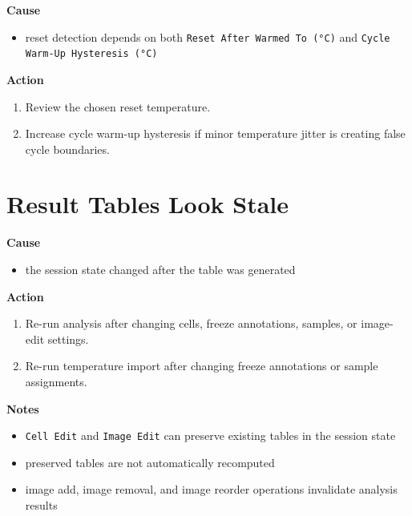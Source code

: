 \documentclass[
  9pt,
  letterpaper,
  oneside,
  open=any,
  DIV=15,
  parskip=half-,
  headings=big,
  numbers=noenddot
]{scrbook}
\newcommand{\manuallead}[1]{%
  \vspace{0.15em}%
  {\sffamily\bfseries\color{ManualBlue}#1}\par\nobreak\vspace{0.05em}%
}
\begin{document}
\manuallead{Cause}

\begin{itemize}[leftmargin=*,itemsep=0.35em,topsep=0.4em]
\item reset detection depends on both \texttt{Reset After Warmed To (°C)} and \texttt{Cycle Warm-Up Hysteresis (°C)}
\end{itemize}

\manuallead{Action}

\begin{enumerate}[leftmargin=*,itemsep=0.35em,topsep=0.4em]
\item Review the chosen reset temperature.
\item Increase cycle warm-up hysteresis if minor temperature jitter is creating false cycle boundaries.
\end{enumerate}

\section{Result Tables Look Stale}

\manuallead{Cause}

\begin{itemize}[leftmargin=*,itemsep=0.35em,topsep=0.4em]
\item the session state changed after the table was generated
\end{itemize}

\manuallead{Action}

\begin{enumerate}[leftmargin=*,itemsep=0.35em,topsep=0.4em]
\item Re-run analysis after changing cells, freeze annotations, samples, or image-edit settings.
\item Re-run temperature import after changing freeze annotations or sample assignments.
\end{enumerate}

\manuallead{Notes}

\begin{itemize}[leftmargin=*,itemsep=0.35em,topsep=0.4em]
\item \texttt{Cell Edit} and \texttt{Image Edit} can preserve existing tables in the session state
\item preserved tables are not automatically recomputed
\item image add, image removal, and image reorder operations invalidate analysis results
\end{itemize}
\end{document}
